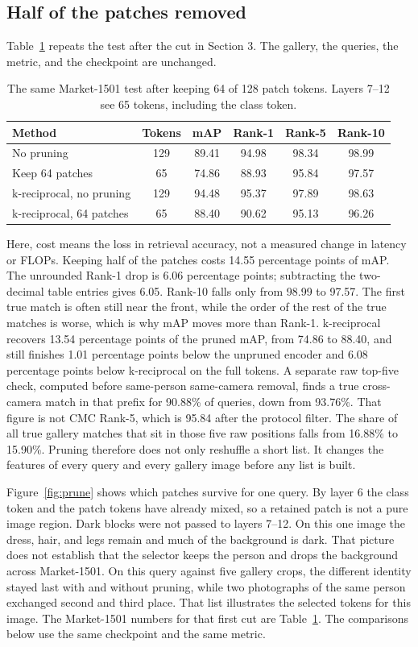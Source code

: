 \documentclass[11pt]{article}
\begin{document}
\subsection{Half of the patches removed}
Table~\ref{tab:prune} repeats the test after the cut in Section 3.
The gallery, the queries, the metric, and the checkpoint are unchanged.

\begin{table}[H]
\centering
\caption{The same Market-1501 test after keeping 64 of 128 patch tokens. Layers 7--12 see 65 tokens, including the class token.}
\label{tab:prune}
\begin{tabular}{lccccc}
\toprule
Method & Tokens & mAP & Rank-1 & Rank-5 & Rank-10 \\
\midrule
No pruning & 129 & 89.41 & 94.98 & 98.34 & 98.99 \\
Keep 64 patches & 65 & 74.86 & 88.93 & 95.84 & 97.57 \\
k-reciprocal, no pruning & 129 & 94.48 & 95.37 & 97.89 & 98.63 \\
k-reciprocal, 64 patches & 65 & 88.40 & 90.62 & 95.13 & 96.26 \\
\bottomrule
\end{tabular}
\end{table}

Here, cost means the loss in retrieval accuracy, not a measured change in latency or FLOPs.
Keeping half of the patches costs 14.55 percentage points of mAP.
The unrounded Rank-1 drop is 6.06 percentage points; subtracting the two-decimal table entries gives 6.05.
Rank-10 falls only from 98.99 to 97.57.
The first true match is often still near the front, while the order of the rest of the true matches is worse, which is why mAP moves more than Rank-1.
k-reciprocal recovers 13.54 percentage points of the pruned mAP, from 74.86 to 88.40, and still finishes 1.01 percentage points below the unpruned encoder and 6.08 percentage points below k-reciprocal on the full tokens.
A separate raw top-five check, computed before same-person same-camera removal, finds a true cross-camera match in that prefix for 90.88\% of queries, down from 93.76\%.
That figure is not CMC Rank-5, which is 95.84 after the protocol filter.
The share of all true gallery matches that sit in those five raw positions falls from 16.88\% to 15.90\%.
Pruning therefore does not only reshuffle a short list.
It changes the features of every query and every gallery image before any list is built.

Figure~\ref{fig:prune} shows which patches survive for one query.
By layer 6 the class token and the patch tokens have already mixed, so a retained patch is not a pure image region.
Dark blocks were not passed to layers 7--12.
On this one image the dress, hair, and legs remain and much of the background is dark.
That picture does not establish that the selector keeps the person and drops the background across Market-1501.
On this query against five gallery crops, the different identity stayed last with and without pruning, while two photographs of the same person exchanged second and third place.
That list illustrates the selected tokens for this image.
The Market-1501 numbers for that first cut are Table~\ref{tab:prune}.
The comparisons below use the same checkpoint and the same metric.
\end{document}
